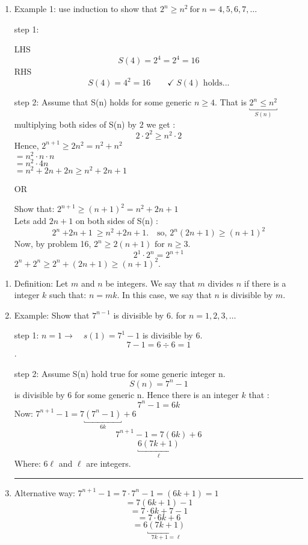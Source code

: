 \documentclass[10pt,letterpaper]{article}
\begin{document}
{
\begin{enumerate}
\item[]
    Example 1: use induction to show that $2^{n} \geq n^{2} \ \text{for} \ n = 4, 5, 6, 7, \ldots$
    
    
    step 1: 
    
    \qquad LHS $$S(4) = 2^{4} = 2^{4} = 16$$
    \qquad RHS $$S(4) = 4^{2} = 16 \qquad \checkmark \ S(4) \text{ holds...}$$
            
    step 2: Assume that S(n) holds for some generic $n\geq 4$. That is $\underbracket{2^{n} \leq n^{2}}_{S(n)}$
    multiplying both sides of S(n) by $2$ we get : 
    $$2 \cdot 2^{2} \geq n^{2} \cdot 2 $$
    Hence,
        $2^{n+1} \geq 2n^{2} = n^{2} + n^{2} $\\
        $= n^{2} \cdot n \cdot n$\\
        $= n^{2} \cdot 4n$\\
        $= n^{2} +2n + 2n \geq n^{2} + 2n + 1$
        
        \begin{center}
            OR
        \end{center}
    Show that: $2^{n+1} \geq (n+1)^{2} = n^{2} + 2n + 1$\\
    Lets add $2n+1$ on both sides of S(n) : $$2^{n}  \ \boxed{+ 2n+1} \ \geq n^{2} \ \boxed{+2n+1}.\quad \text{so, } 2^{n}(2n+1) \geq (n+1)^{2}$$
    Now, by problem 16, $2^{n} \geq 2(n+1) \text{ for } n \geq 3$.
    $$2^{1} \cdot 2^{n} = 2^{n+1} $$
    $2^{n} + 2^{n} \geq 2^{n} + (2n+1) \geq (n+1)^{2}.$
    
    
\end{enumerate}

\newpage{}
\begin{enumerate}
    \item [] Definition: Let $m$ and $n$ be integers. We say that $m$ divides $n$ if there is a integer $k$ such that: $n = mk$. In this case, we say that $n$ is divisible by $m$.
    
    \item[] Example: Show that $7^{n-1}$ is divisible by $6$. for $n=1,2,3, \ldots$
    
    step 1: $n=1 \rightarrow \quad s(1) = 7^{1} - 1$ is divisible by $6$.  
    $$7 - 1 = 6 \div 6 = 1 $$ \checkmark.
    
    step 2: Assume S(n) hold true for some generic integer n.
    $$S(n) = 7^{n} - 1$$ is divisible by 6 for some generic n. Hence there is an integer $k$ that :
    $$7^{n} - 1 = 6k$$
    Now: $7^{n+1} - 1 = 7 \underbracket{(7^{n} - 1)}_{6k} + 6$
    $$7^{n+1} - 1 = 7(6k) + 6$$
    $$\underbracket{6(7k+1)}_{\ell}$$
    Where:
    $6\ell$ and $\ell$ are integers.
    \vspace{1em}
    \hrule 
    \item[] Alternative way: $ 7^{n+1} - 1 = 7\cdot 7^{n} - 1 = (6k +1) =1$
    $$ = 7(6k + 1) -1 $$
    $$ = 7\cdot6k + 7 - 1$$
    $$ = 7\cdot6k + 6$$
    $$ = 6\underbracket{(7k +1)}_{7k+1 = \ell}$$ 
\end{enumerate}{}

}
\end{document}
